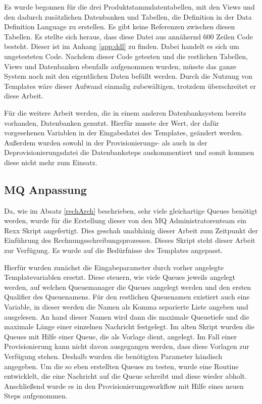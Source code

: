 Es wurde begonnen für die drei Produktstammdatentabellen, mit den Views und den dadurch zusätzlichen Datenbanken und Tabellen, die Definition in der Data Definition Language zu erstellen.
Es gibt keine Referenzen zwischen diesen Tabellen.
Es stellte sich heraus, dass diese Datei aus annähernd 600 Zeilen Code besteht.
Dieser ist im Anhang \ref{app:ddl} zu finden.
Dabei handelt es sich um ungetesteten Code.
Nachdem dieser Code getesten und die restlichen Tabellen, Views und Datenbanken ebenfalls aufgenommen wurden, müsste das ganze System noch mit den eigentlichen Daten befüllt werden.
Durch die Nutzung von Templates wäre dieser Aufwand einmalig zubewältigen, trotzdem überschreitet er diese Arbeit.

Für die weitere Arbeit werden, die in einem anderen Datenbanksystem bereits vorhanden, Datenbanken genutzt.
Hierfür musste der Wert, der dafür vorgesehenen Variablen in der Eingabedatei des Templates, geändert werden.
Außerdem wurden sowohl in der Provisionierungs- als auch in der Deprovisionierungsdatei die Datenbanksteps auskommentiert und somit kommen diese nicht mehr zum Einsatz.

\subsection{MQ Anpassung}\label{ssec:mqentw}
Da, wie im Absatz \ref{rechArch} beschrieben, sehr viele gleichartige Queues benötigt werden, wurde für die Erstellung dieser von den MQ Administratorenteam ein Rexx Skript angefertigt.
Dies geschah unabhänig dieser Arbeit zum Zeitpunkt der Einführung des Rechnungsschreibungsprozesses.
Dieses Skript steht dieser Arbeit zur Verfügung.
Es wurde auf die Bedürfnisse des Templates angepasst.

Hierfür wurden zunächst die Eingabeparameter durch vorher angelegte Templatevariablen ersetzt.
Diese steuern, wie viele Queues jeweils angelegt werden, auf welchen Queuemanager die Queues angelegt werden und den ersten Qualifier des Queuenamens.
Für den restlichen Queuenamen existiert auch eine Variable, in dieser werden die Namen als Komma separierte Liste angeben und ausgelesen.
An hand dieser Namen wird dann die maximale Queuetiefe und die maximale Länge einer einzelnen Nachricht festgelegt.
Im alten Skript wurden die Queues mit Hilfe einer Queue, die als Vorlage dient, angelegt.
Im Fall einer Provisionierung kann nicht davon ausgegangen werden, dass diese Vorlagen zur Verfügung stehen.
Deshalb wurden die benötigten Parameter händisch angegeben.
Um die so eben erstellten Queues zu testen, wurde eine Routine entwicklelt, die eine Nachricht auf die Queue schreibt und diese wieder abholt.
Anschließend wurde es in den Provisionierungsworkflow mit Hilfe eines neuen Steps aufgenommen.

